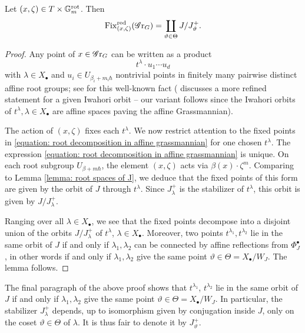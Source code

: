 \begin{lemma}\label{lemma: fixed points on affine Grassmannian}
 Let $(x, \zeta) \in T \times \mathbb{G}_m^{\mathrm{rot}}$. Then
 \begin{equation}\label{equation: fixed points on Gr}
     \operatorname{Fix}^{\operatorname{red}}_{(x, \zeta)}(\operatorname{\mathscr{G}r}_G) = \coprod_{\vartheta \in \Theta} J/J^{+}_{\vartheta}. 
 \end{equation}
\end{lemma}
\begin{proof}
Any point of $x \in \operatorname{\mathscr{G}r}_G$ can be written as a product
\begin{equation}\label{equation: root decomposition in affine grassmannian}
t^{\lambda} \cdot u_1 \cdots u_d
\end{equation}
with $\lambda \in X_{\bullet}$ and $u_i \in U_{\beta_i + m_i\hbar}$ nontrivial points in finitely many pairwise distinct affine root groups; see \cite[proof of Lemma 4.4]{RW22} for this well-known fact (\cite{RW22} discusses a more refined statement for a given Iwahori orbit -- our variant follows since the Iwahori orbits of $t^{\lambda}, \lambda \in X_{\bullet}$ are affine spaces paving the affine Grassmannian). 

The action of $(x, \zeta)$ fixes each $t^{\lambda}$. We now restrict attention to the fixed points in \eqref{equation: root decomposition in affine grassmannian} for one chosen $t^{\lambda}$. The expression \eqref{equation: root decomposition in affine grassmannian} is unique. On each root subgroup $U_{\beta + m\hbar}$, the element $(x, \zeta)$ acts via $\beta(x) \cdot \zeta^m$. Comparing to Lemma \ref{lemma: root spaces of J}, we deduce that the fixed points of this form are given by the orbit of $J$ through $t^{\lambda}$. Since $J^+_{\lambda}$ is the stabilizer of $t^{\lambda}$, this orbit is given by $J/J^+_{\lambda}$.

Ranging over all $\lambda \in X_{\bullet}$, we see that the fixed points decompose into a disjoint union of the orbits $J/J^+_{\lambda}$ of $t^{\lambda}$, $\lambda \in X_{\bullet}$. Moreover, two points $t^{\lambda_1}, t^{\lambda_2}$ lie in the same orbit of $J$ if and only if $\lambda_1, \lambda_2$ can be connected by affine reflections from $\Phi^{\bullet}_J$, in other words if and only if $\lambda_1, \lambda_2$ give the same point $\vartheta \in \Theta = X_{\bullet} / W_{J}$.
The lemma follows.
\end{proof}

\begin{remark}\label{remark: independece of J vartheta on the lift}
The final paragraph of the above proof shows that $t^{\lambda_1}$, $t^{\lambda_2}$ lie in the same orbit of $J$ if and only if $\lambda_1, \lambda_2$ give the same point $\vartheta \in \Theta = X_{\bullet} / W_{J}$. In particular, the stabilizer $J^{+}_{\lambda}$ depends, up to isomorphism given by conjugation inside $J$, only on the coset $\vartheta \in \Theta$ of $\lambda$. It is thus fair to denote it by $J^+_{\vartheta}$.
\end{remark}


